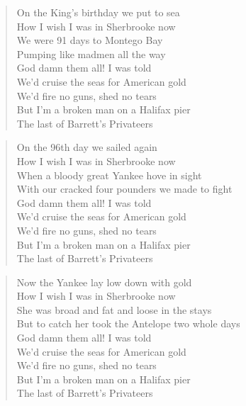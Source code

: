 \documentclass[8pt,twoside]{extarticle}
\newenvironment{xverse}{
	\penalty 10000
	\begin{verse}
	\parskip 4pt
	}
	{
	\end{verse}
	\penalty 0
	}
\begin{document}
\begin{xverse}
On the King's birthday we put to sea \\
How I wish I was in Sherbrooke now \\
We were 91 days to Montego Bay \\
Pumping like madmen all the way \\
God damn them all! I was told \\
We'd cruise the seas for American gold \\
We'd fire no guns, shed no tears \\
But I'm a broken man on a Halifax pier \\
The last of Barrett's Privateers \\
\end{xverse}

\begin{xverse}
On the 96th day we sailed again \\
How I wish I was in Sherbrooke now \\
When a bloody great Yankee hove in sight \\
With our cracked four pounders we made to fight \\
God damn them all! I was told \\
We'd cruise the seas for American gold \\
We'd fire no guns, shed no tears \\
But I'm a broken man on a Halifax pier \\
The last of Barrett's Privateers \\
\end{xverse}

\begin{xverse}
Now the Yankee lay low down with gold \\
How I wish I was in Sherbrooke now \\
She was broad and fat and loose in the stays \\
But to catch her took the Antelope two whole days \\
God damn them all! I was told \\
We'd cruise the seas for American gold \\
We'd fire no guns, shed no tears \\
But I'm a broken man on a Halifax pier \\
The last of Barrett's Privateers \\
\end{xverse}
\end{document}
